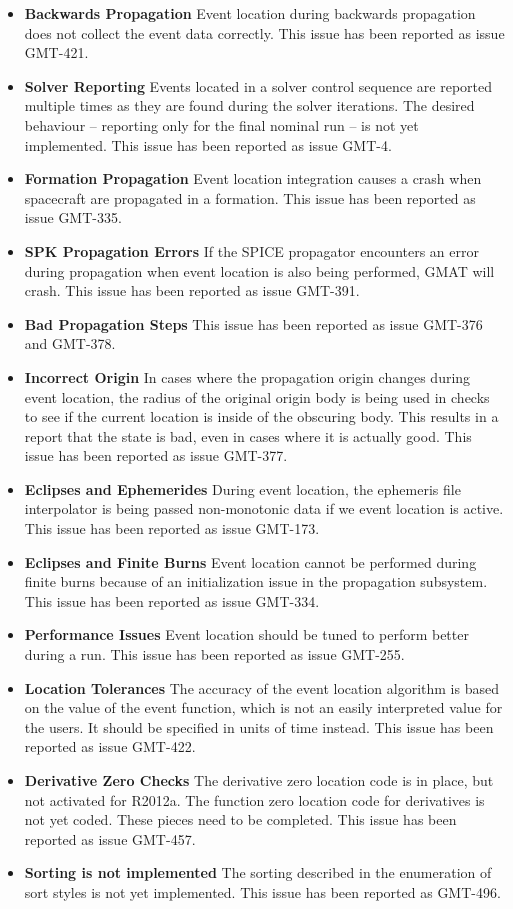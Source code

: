 \documentclass[letterpaper,10pt]{article}
\begin{document}
\begin{itemize}
\item \textbf{Backwards Propagation} Event location during backwards propagation does not collect the event data correctly.  This issue has been reported as issue GMT-421.
\item \textbf{Solver Reporting} Events located in a solver control sequence are reported multiple times as they are found during the solver iterations.  The desired behaviour -- reporting only for the final nominal run -- is not yet implemented. This issue has been reported as issue GMT-4.
\item \textbf{Formation Propagation}  Event location integration causes a crash when spacecraft are propagated in a formation.  This issue has been reported as issue GMT-335.
\item \textbf{SPK Propagation Errors}  If the SPICE propagator encounters an error during propagation when event location is also being performed, GMAT will crash.  This issue has been reported as issue GMT-391.
\item \textbf{Bad Propagation Steps}  This issue has been reported as issue GMT-376 and GMT-378.
\item\textbf{Incorrect Origin}  In cases where the propagation origin changes during event location, the radius of the original origin body is being used in checks to see if the current location is inside of the obscuring body.  This results in a report that the state is bad, even in cases where it is actually good.  This issue has been reported as issue GMT-377.
\item \textbf{Eclipses and Ephemerides}  During event location, the ephemeris file interpolator is being passed non-monotonic data if we event location is active.  This issue has been reported as issue GMT-173.
\item \textbf{Eclipses and Finite Burns}  Event location cannot be performed during finite burns because of an initialization issue in the propagation subsystem.  This issue has been reported as issue GMT-334.
\item \textbf{Performance Issues}  Event location should be tuned to perform better during a run.  This issue has been reported as issue GMT-255.
\item \textbf{Location Tolerances}  The accuracy of the event location algorithm is based on the value of the event function, which is not an easily interpreted value for the users.  It should be specified in units of time instead.  This issue has been reported as issue GMT-422.
\item \textbf{Derivative Zero Checks}  The derivative zero location code is in place, but not activated for R2012a.  The function zero location code for derivatives is not yet coded.  These pieces need to be completed.  This issue has been reported as issue GMT-457. 
\item \textbf{Sorting is not implemented}  The sorting described in the enumeration of sort styles is not yet implemented.  This issue has been reported as GMT-496.
\end{itemize}
\end{document}
